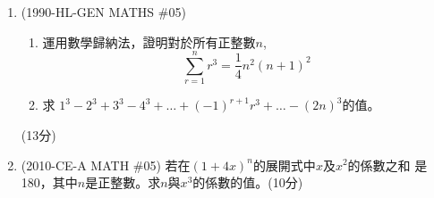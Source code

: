 \documentclass[12pt]{article}
\begin{document}
    \newpage
    \begin{enumerate}
        \item (1990-HL-GEN MATHS \#05)  \begin{enumerate}
            \item 運用數學歸納法，證明對於所有正整數$n$, $$\sum_{r=1}^{n}r^3=\frac{1}{4}n^2(n+1)^2$$
            \item 求 $1^3-2^3+3^3-4^3+\dots+(-1)^{r+1}r^3+\dots-(2n)^3$的值。
        \end{enumerate}\hfill(13分)
        
            \hrulefill
            
            \hrulefill
            
            \hrulefill
            
            \hrulefill
            
            \hrulefill
            
            \hrulefill
            
            \hrulefill
            
            \hrulefill
            
            \hrulefill
            
            \hrulefill
            
            \hrulefill
            
            \hrulefill
            
            \hrulefill
            
            \hrulefill
            
            \hrulefill
            
            \hrulefill
            
            \hrulefill
            
            \hrulefill
            
            \hrulefill
            
            \hrulefill
            
            \hrulefill

        \pagebreak
        \item (2010-CE-A MATH \#05) 若在$(1+4x)^n$的展開式中$x$及$x^2$的係數之和 是180，其中$n$是正整數。求$n$與$x^3$的係數的值。\hfill(10分)
        
        \hrulefill
            
        \hrulefill
        
        \hrulefill
        

\end{enumerate}
\end{document}
